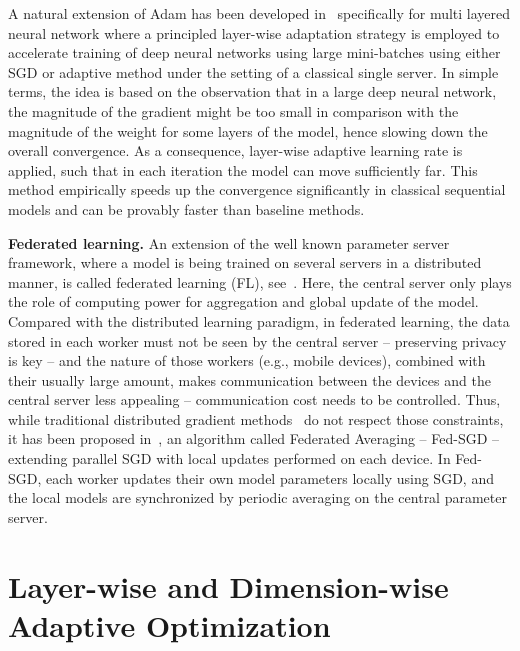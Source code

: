 \documentclass[manuscript,screen,review]{acmart}
\begin{document}
A natural extension of Adam has been developed in~\citet{you2019large} specifically for multi layered neural network where a principled layer-wise adaptation strategy is employed to accelerate training of deep neural networks using large mini-batches using either SGD or adaptive method under the setting of a classical single server. 
In simple terms, the idea is based on the observation that in a large deep neural network, the magnitude of the gradient might be too small in comparison with the magnitude of the weight for some layers of the model, hence slowing down the overall convergence. 
As a consequence, layer-wise adaptive learning rate is applied, such that in each iteration the model can move sufficiently far. 
This method empirically speeds up the convergence significantly in classical sequential models and can be provably faster than baseline methods.


\vspace{0.1in}
\noindent\textbf{Federated learning.}
An extension of the well known parameter server framework, where a model is being trained on several servers in a distributed manner, is called federated learning (FL), see~\citet{konevcny2016federated}.
Here, the central server only plays the role of computing power for aggregation and global update of the model.
Compared with the distributed learning paradigm, in federated learning, the data stored in each worker must not be seen by the central server -- preserving privacy is key -- and the nature of those workers (e.g., mobile devices), combined with their usually large amount, makes communication between the devices and the central server less appealing -- communication cost needs to be controlled.
Thus, while traditional distributed gradient methods~\citep{recht2011hogwild,li2014scaling,zhao2020distributed} do not respect those constraints, it has been proposed in~\citet{mcmahan2017communication}, an algorithm called Federated Averaging -- Fed-SGD -- extending parallel SGD with local updates performed on each device. 
In Fed-SGD, each worker updates their own model parameters locally using SGD, and the local models are synchronized by periodic averaging on the central parameter server.

\section{Layer-wise and Dimension-wise Adaptive Optimization}\label{sec:main}
\end{document}
